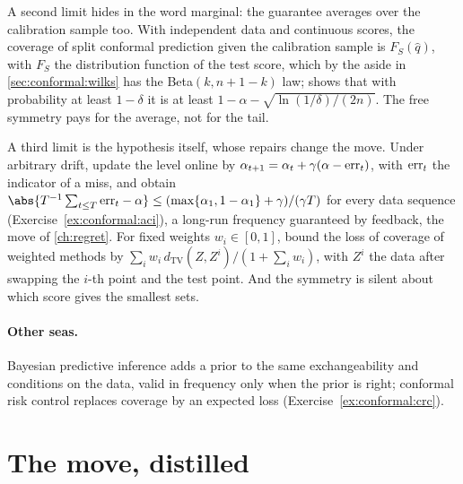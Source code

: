 \begin{refsection}
A second limit hides in the word marginal: the guarantee averages over the calibration sample too. With independent data and continuous scores, the coverage of split conformal prediction given the calibration sample is $F_S(\widehat q)$, with $F_S$ the distribution function of the test score, which by the aside in \cref{sec:conformal:wilks} has the Beta$(k,n+1-k)$ law; \textcite{Vovk2012} shows that with probability at least $1-\delta$ it is at least $1-\alpha-\sqrt{\ln(1/\delta)/(2n)}$. The free symmetry pays for the average, not for the tail.

A third limit is the hypothesis itself, whose repairs change the move. Under arbitrary drift, \textcite{GibbsCandes2021} update the level online by $\alpha_{t+1}=\alpha_t+\gamma(\alpha-\mathrm{err}_t)$, with $\mathrm{err}_t$ the indicator of a miss, and obtain $\abs{T^{-1}\sum_{t\le T}\conformalerr_t-\alpha}\le(\max\{\alpha_1,1-\alpha_1\}+\gamma)/(\gamma T)$ for every data sequence (Exercise~\ref{ex:conformal:aci}), a long-run frequency guaranteed by feedback, the move of \cref{ch:regret}. For fixed weights $w_i\in[0,1]$, \textcite{Barber2023} bound the loss of coverage of weighted methods by $\sum_iw_i\,d_{\mathrm{TV}}(Z,Z^i)/(1+\sum_iw_i)$, with $Z^i$ the data after swapping the $i$-th point and the test point. And the symmetry is silent about which score gives the smallest sets.

\paragraph{Other seas.} Bayesian predictive inference adds a prior to the same exchangeability and conditions on the data, valid in frequency only when the prior is right; conformal risk control replaces coverage by an expected loss (Exercise~\ref{ex:conformal:crc}).

\section{The move, distilled}\label{sec:conformal:distilled}


\end{refsection}
